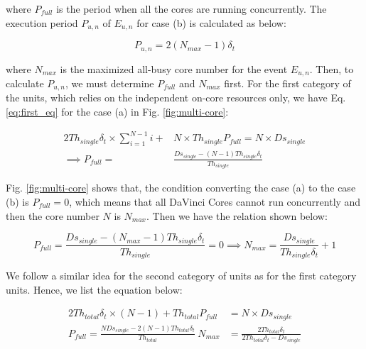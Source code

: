 \documentclass[12pt]{extbook}
\begin{document}
where $P_{full}$ is the period when all the cores are running concurrently. The execution period $P_{u, n}$ of $E_{u, n}$ for case (b) is calculated as below:

\begin{equation}
P_{u, n} = 2 (N_{max} - 1) \delta_{t}
\end{equation}

where $N_{max}$ is the maximized all-busy core number for the event $E_{u, n}$. Then, to calculate $P_{u, n}$, we must determine $P_{full}$ and $N_{max}$ first. For the first category of the units, which relies on the independent on-core resources only, we have Eq. \ref{eq:first_eq} for the case (a) in Fig. \ref{fig:multi-core}:

\begin{equation}
\label{eq:first_eq}
\begin{aligned}
    2 Th_{single} \delta_{t} \times \sum_{i=1}^{N-1}{i} + & N \times Th_{single} P_{full} = N \times Ds_{single} \\
    \implies P_{full} = & \frac{Ds_{single} - (N - 1) Th_{single} \delta_{t}}{Th_{single}} 
\end{aligned}
\end{equation}

Fig. \ref{fig:multi-core} shows that, the condition converting the case (a) to the case (b) is $P_{full} = 0$, which means that all DaVinci Cores cannot run concurrently and then the core number $N$ is $N_{max}$. Then we have the relation shown below:

\begin{equation}
P_{full} = \frac{Ds_{single} - (N_{max} - 1) Th_{single} \delta_{t}}{Th_{single}} = 0 \implies
N_{max} = \frac{Ds_{single}}{Th_{single} \delta_{t}} + 1
\end{equation}

We follow a similar idea for the second category of units as for the first category units. Hence, we list the equation below:

\begin{equation}
\label{eq:second_eq}
    \begin{aligned}
    2 Th_{total} \delta_{t} \times (N - 1) + Th_{total} P_{full} & = N \times Ds_{single} \\
    P_{full} = \frac{N Ds_{single} - 2 (N - 1) Th_{total} \delta_{t}}{Th_{total}}
    \  
    N_{max} & = \frac{2 Th_{total} \delta_{t}}{2 Th_{total} \delta_{t} - Ds_{single}}
    \end{aligned}
\end{equation}
\end{document}
